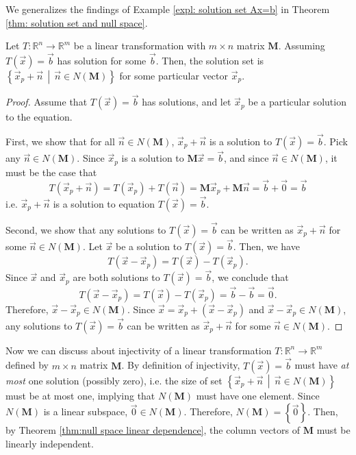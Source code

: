 \documentclass[]{book}
\newcommand{\suchthat}{\,\middle|\,}
\newcommand{\mat}[1]{\ensuremath{\mathbf{#1}}}
\newcommand{\R}{\ensuremath{\mathbb{R}}}
\begin{document}
We generalizes the findings of Example \ref{expl: solution set Ax=b} in Theorem \ref{thm: solution set and null space}.
\begin{theorem}
    \label{thm: solution set and null space}
    Let $T:\R^n \to \R^m$ be a linear transformation with $m \times n$ matrix $\mat{M}$. Assuming $T\left(\vec{x}\right) = \vec{b}$ has solution for some $\vec{b}$. Then, the solution set is $\left\{\vec{x}_p + \vec{n} \suchthat \vec{n} \in N(\mat{M})\right\}$ for some particular vector $\vec{x}_p$.
\begin{proof}
    Assume that $T(\vec{x}) = \vec{b}$ has solutions, and let $\vec{x}_p$ be a particular solution to the equation. 
    
    First, we show that for all $\vec{n} \in N(\mat{M})$, $\vec{x}_p + \vec{n}$ is a solution to $T(\vec{x}) = \vec{b}$. Pick any $\vec{n} \in N(\mat{M})$. 
    Since $\vec{x}_p$ is a solution to $\mat{M}\vec{x} = \vec{b}$, and since $\vec{n} \in N(\mat{M})$, it must be the case that
    \[T(\vec{x}_p + \vec{n}) = T(\vec{x}_p) + T(\vec{n}) = \mat{M}\vec{x}_p + \mat{M}\vec{n} = \vec{b} + \vec{0} = \vec{b}\] i.e. $\vec{x}_p + \vec{n}$ is a solution to equation $T(\vec{x}) = \vec{b}$.
    
    Second, we show that any solutions to $T(\vec{x}) = \vec{b}$ can be written as $\vec{x}_p + \vec{n}$ for some $\vec{n} \in N(\mat{M})$. Let $\vec{x}$ be a solution to $T(\vec{x}) = \vec{b}$. Then, we have
    \[T(\vec{x} - \vec{x}_p) = T(\vec{x}) - T(\vec{x}_p).\]
    Since $\vec{x}$ and $\vec{x}_p$ are both solutions to $T(\vec{x} )= \vec{b}$, we conclude that 
    \[T(\vec{x} - \vec{x}_p) = T(\vec{x}) - T(\vec{x}_p) = \vec{b} - \vec{b} = \vec{0}.\]
    Therefore, $\vec{x} - \vec{x}_p \in N(\mat{M})$. Since $\vec{x} = \vec{x}_p + (\vec{x} - \vec{x}_p)$ and $\vec{x} - \vec{x}_p \in N(\mat{M})$, any solutions to $T(\vec{x}) = \vec{b}$ can be written as $\vec{x}_p + \vec{n}$ for some $\vec{n} \in N(\mat{M})$.
\end{proof}
\end{theorem}

Now we can discuss about injectivity of a linear transformation $T:\R^n \to \R^m$ defined by $m \times n$ matrix $\mat{M}$. By definition of injectivity, $T(\vec{x}) = \vec{b}$ must have \textit{at most} one solution (possibly zero), i.e. the size of set $\left\{\vec{x}_p + \vec{n} \suchthat \vec{n} \in N(\mat{M})\right\}$ must be at most one, implying that $N(\mat{M})$ must have one element. Since $N(\mat{M})$ is a linear subspace, $\vec{0} \in N(\mat{M})$. Therefore, $N(\mat{M}) = \left\{\vec{0}\right\}$. Then, by Theorem \ref{thm:null space linear dependence}, the column vectors of $\mat{M}$ must be linearly independent. 
\end{document}
